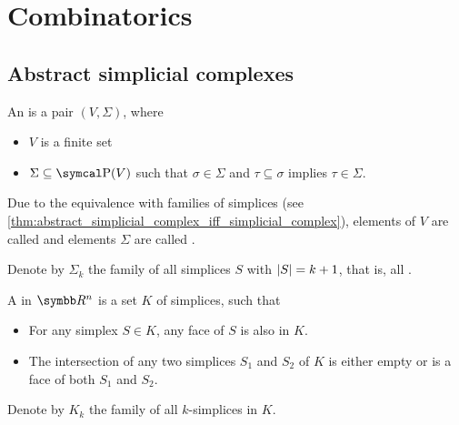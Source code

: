 \section{Combinatorics}\label{sec:combinatorics}
\subsection{Abstract simplicial complexes}\label{subsec:abstract_simplicial_complexes}

\begin{definition}\label{def:abstract_simplicial_complex}\cite[definition 2.1]{Carlsson2009}
  An  is a pair \( (V, \Sigma) \), where
  \begin{itemize}
    \item \( V \) is a finite set
    \item \( \Sigma \subseteq \Power(V) \) such that \( \sigma \in \Sigma \) and \( \tau \subseteq \sigma \) implies \( \tau \in \Sigma \).
  \end{itemize}

  Due to the equivalence with families of simplices (see \cref{thm:abstract_simplicial_complex_iff_simplicial_complex}), elements of \( V \) are called  and elements \( \Sigma \) are called .

  Denote by \( \Sigma_k \) the family of all simplices \( S \) with \( \left\vert S \right\vert = k + 1 \), that is, all .
\end{definition}

\begin{definition}\label{def:simplicial_complex}
  A  in \( \R^n \) is a set \( K \) of simplices, such that
  \begin{itemize}
    \item For any simplex \( S \in K \), any face of \( S \) is also in \( K \).
    \item The intersection of any two simplices \( S_1 \) and \( S_2 \) of \( K \) is either empty or is a face of both \( S_1 \) and \( S_2 \).
  \end{itemize}

  Denote by \( K_k \) the family of all \( k \)-simplices in \( K \).
\end{definition}

